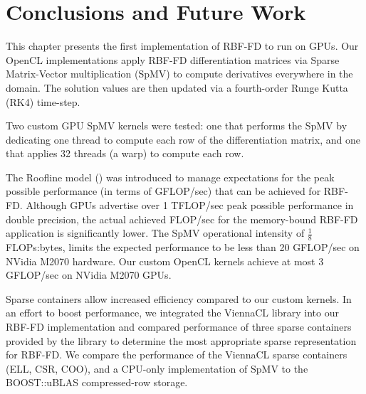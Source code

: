 \documentclass{report}
\begin{document}
\section{Conclusions and Future Work}

This chapter presents the first implementation of RBF-FD to run on GPUs. Our OpenCL implementations apply RBF-FD differentiation matrices via Sparse Matrix-Vector multiplication (SpMV) to compute derivatives everywhere in the domain. The solution values are then updated via a fourth-order Runge Kutta (RK4) time-step. 

Two custom GPU SpMV kernels were tested: one that performs the SpMV by dedicating one thread to compute each row of the differentiation matrix, and one that applies 32 threads (a warp) to compute each row. 

The Roofline model (\cite{Williams2009}) was introduced to manage expectations for the peak possible performance (in terms of GFLOP/sec) that can be achieved for RBF-FD. Although GPUs advertise over 1 TFLOP/sec peak possible performance in double precision, the actual achieved FLOP/sec for the memory-bound RBF-FD application is significantly lower. The SpMV operational intensity of $\frac{1}{8}$ FLOPs:bytes, limits the expected performance to be less than 20 GFLOP/sec on NVidia M2070 hardware. Our custom OpenCL kernels achieve at most 3 GFLOP/sec on NVidia M2070 GPUs.



Sparse containers allow increased efficiency compared to our custom kernels. 
In an effort to boost performance, we integrated the ViennaCL library into our RBF-FD implementation and compared performance of three sparse containers provided by the library to determine the most appropriate sparse representation for RBF-FD. We compare the performance of the ViennaCL sparse containers (ELL, CSR, COO), and a CPU-only implementation of SpMV to the BOOST::uBLAS compressed-row storage. 


\end{document}
